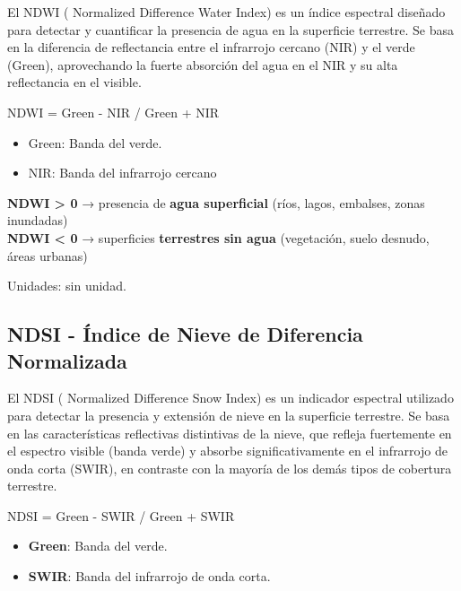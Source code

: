 \documentclass[
]{book}
\providecommand{\tightlist}{%
  \setlength{\itemsep}{0pt}\setlength{\parskip}{0pt}}
\begin{document}
El NDWI ( Normalized Difference Water Index) es un índice espectral diseñado para detectar y cuantificar la presencia de agua en la superficie terrestre. Se basa en la diferencia de reflectancia entre el infrarrojo cercano (NIR) y el verde (Green), aprovechando la fuerte absorción del agua en el NIR y su alta reflectancia en el visible.

NDWI = Green - NIR / Green + NIR\hspace{0pt}

\begin{itemize}
\tightlist
\item
  Green: Banda del verde.\\
\item
  NIR: Banda del infrarrojo cercano
\end{itemize}

\textbf{NDWI \textgreater{} 0} → presencia de \textbf{agua superficial} (ríos, lagos, embalses, zonas inundadas)\\
\textbf{NDWI \textless{} 0} → superficies \textbf{terrestres sin agua} (vegetación, suelo desnudo, áreas urbanas)

Unidades: sin unidad.

\subsection{\texorpdfstring{\textbf{NDSI} - Índice de Nieve de Diferencia Normalizada}{NDSI - Índice de Nieve de Diferencia Normalizada}}\label{ndsi---uxedndice-de-nieve-de-diferencia-normalizada-1}

El NDSI ( Normalized Difference Snow Index) es un indicador espectral utilizado para detectar la presencia y extensión de nieve en la superficie terrestre. Se basa en las características reflectivas distintivas de la nieve, que refleja fuertemente en el espectro visible (banda verde) y absorbe significativamente en el infrarrojo de onda corta (SWIR), en contraste con la mayoría de los demás tipos de cobertura terrestre.

NDSI = Green - SWIR / Green + SWIR\hspace{0pt}

\begin{itemize}
\tightlist
\item
  \textbf{Green}: Banda del verde.\\
\item
  \textbf{SWIR}: Banda del infrarrojo de onda corta.
\end{itemize}
\end{document}
